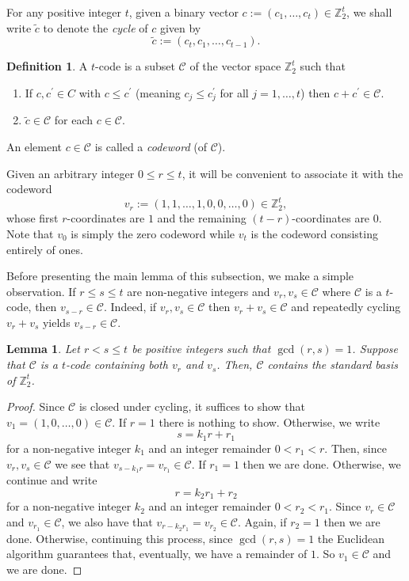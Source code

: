 \documentclass[10pt, reqno]{amsart}
\newcommand{\ZZ}{\mathbb{Z}}
\newcommand{\C}{\mathcal{C}}
\numberwithin{equation}{section}
\theoremstyle{definition}
\newtheorem{defn}{Definition}[section]
\theoremstyle{remark}
\theoremstyle{plain}
\newtheorem{lem}[prop]{Lemma}
\begin{document}
	For any positive integer $t$, given a binary vector $c := (c_1,\dots,c_t) \in \ZZ_2^t$, we shall write $\tilde{c}$ to denote the \emph{cycle} of $c$ given by
	\[
	\tilde{c} := (c_t, c_1,\dots,c_{t-1}).
	\]
	
	\begin{defn}
		A $t$-code is a subset $\C$ of the vector space $\ZZ_2^t$ such that
		\begin{enumerate}		
			\item If $c, c^\prime\in C$ with $c\le c^\prime$ (meaning $c_j \le c_j^\prime$ for all $j=1, \dots, t$) then $c+c^\prime \in \C$. 
			\item $\tilde{c} \in \C$ for each $c \in \C$.
		\end{enumerate} 
		An element $c \in \C$ is called a \emph{codeword} (of $\C$).
	\end{defn}
	
	Given an arbitrary integer $0\le r \le t$, it will be convenient to associate it with the codeword
	\[
	v_r := (1,1,\dots,1,0,0,\dots,0)\in \ZZ_2^t,
	\]
	whose first $r$-coordinates are $1$ and the remaining $(t-r)$-coordinates are $0$. Note that $v_0$ is simply the zero codeword while $v_t$ is the codeword consisting entirely of ones.
	
	
	Before presenting the main lemma of this subsection, we make a simple observation. If $r \leq s \le t$ are non-negative integers and $v_r, v_s \in \C$ where $\C$ is a $t$-code, then $v_{s-r} \in \C$. Indeed, if $v_r, v_s\in \C$ then $v_r+v_s\in \C$ and repeatedly cycling $v_r+v_s$ yields $v_{s-r} \in \C$. 
	
	
	\begin{lem}\label{lem:euclid}
		Let $r<s\le t$ be positive integers such that $\gcd(r,s) = 1$. Suppose that $\C$ is a $t$-code containing both $v_r$ and $v_s$. Then, $\C$ contains the standard basis of $\ZZ_2^t$.
	\end{lem}
	\begin{proof}
		Since $\C$ is closed under cycling, it suffices to show that $v_1 = (1, 0, \dots, 0) \in \C$. If $r = 1$ there is nothing to show. Otherwise, we write
		\[
		s = k_1 r + r_1
		\]
		for a non-negative integer $k_1$ and an integer remainder $0< r_1 < r$. Then, since $v_r, v_s \in \C$ we see that $v_{s-k_1r} = v_{r_1} \in \C$. If $r_1 = 1$ then we are done. Otherwise, we continue and write
		\[
		r = k_2r_1 + r_2
		\]
		for a non-negative integer $k_2$ and an integer remainder $0< r_2 < r_1$. Since $v_r\in \C$ and $v_{r_1} \in \C$, we also have that $v_{r-k_2r_1} = v_{r_2} \in \C$. Again, if $r_2 = 1$ then we are done. Otherwise, continuing  this process, since $\gcd(r,s) = 1$ the Euclidean algorithm guarantees that, eventually, we have a remainder of $1$. So $v_1\in \C$ and we are done.
	\end{proof}
	
\end{document}
